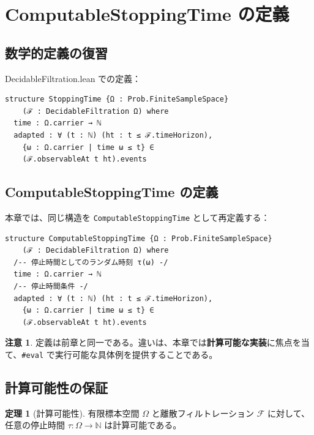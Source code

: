 \documentclass[12pt,a4paper,ja=standard]{bxjsarticle}
\theoremstyle{definition}
\newtheorem{theorem}[definition]{定理}
\newtheorem{remark}[definition]{注意}
\begin{document}
\section{ComputableStoppingTime の定義}\label{sec:definition}

\subsection{数学的定義の復習}

DecidableFiltration.lean での定義：

\begin{tcolorbox}[title=StoppingTime（前章）]
\begin{verbatim}
structure StoppingTime {Ω : Prob.FiniteSampleSpace}
    (ℱ : DecidableFiltration Ω) where
  time : Ω.carrier → ℕ
  adapted : ∀ (t : ℕ) (ht : t ≤ ℱ.timeHorizon),
    {ω : Ω.carrier | time ω ≤ t} ∈ 
    (ℱ.observableAt t ht).events
\end{verbatim}
\end{tcolorbox}

\subsection{ComputableStoppingTime の定義}

本章では、同じ構造を \texttt{ComputableStoppingTime} として再定義する：

\begin{tcolorbox}[title=Lean コード（55--62 行目）]
\begin{verbatim}
structure ComputableStoppingTime {Ω : Prob.FiniteSampleSpace}
    (ℱ : DecidableFiltration Ω) where
  /-- 停止時間としてのランダム時刻 τ(ω) -/
  time : Ω.carrier → ℕ
  /-- 停止時間条件 -/
  adapted : ∀ (t : ℕ) (ht : t ≤ ℱ.timeHorizon),
    {ω : Ω.carrier | time ω ≤ t} ∈ 
    (ℱ.observableAt t ht).events
\end{verbatim}
\end{tcolorbox}

\begin{remark}
定義は前章と同一である。違いは、本章では\textbf{計算可能な実装}に焦点を当て、\texttt{\#eval} で実行可能な具体例を提供することである。
\end{remark}

\subsection{計算可能性の保証}

\begin{theorem}[計算可能性]
有限標本空間 $\Omega$ と離散フィルトレーション $\mathcal{F}$ に対して、任意の停止時間 $\tau : \Omega \to \mathbb{N}$ は計算可能である。
\end{theorem}
\end{document}
